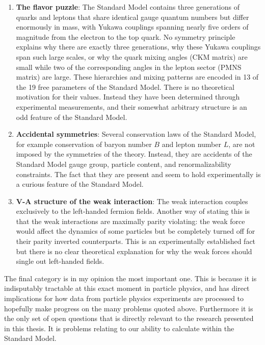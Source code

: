 \begin{enumerate}
    \item{
        \textbf{The flavor puzzle}: The Standard Model contains three generations of quarks and leptons that share identical gauge quantum numbers but differ enormously in mass, with Yukawa couplings spanning nearly five orders of magnitude from the electron to the top quark.
        No symmetry principle explains why there are exactly three generations, why these Yukawa couplings span such large scales, or why the quark mixing angles (CKM matrix) are small while two of the corresponding angles in the lepton sector (PMNS matrix) are large.
        These hierarchies and mixing patterns are encoded in 13 of the 19 free parameters of the Standard Model.
        There is no theoretical motivation for their values.
        Instead they have been determined through experimental measurements, and their somewhat arbitrary structure is an odd feature of the Standard Model.
    }
    \item{
        \textbf{Accidental symmetries}: Several conservation laws of the Standard Model, for example conservation of baryon number $B$ and lepton number $L$, are not imposed by the symmetries of the theory.
        Instead, they are accidents of the Standard Model gauge group, particle content, and renormalizability constraints.
        The fact that they are present and seem to hold experimentally is a curious feature of the Standard Model.
    }
    \item{
        \textbf{V-A structure of the weak interaction}: The weak interaction couples exclusively to the left-handed fermion fields.
        Another way of stating this is that the weak interactions are maximally parity violating: the weak force would affect the dynamics of some particles but be completely turned off for their parity inverted counterparts.
        This is an experimentally established fact but there is no clear theoretical explanation for why the weak forces should single out left-handed fields.
    }
\end{enumerate}

The final category is in my opinion the most important one.
This is because it is indisputably tractable at this exact moment in particle physics, and has direct implications for how data from particle physics experiments are processed to hopefully make progress on the many problems quoted above.
Furthermore it is the only set of open questions that is directly relevant to the research presented in this thesis.
It is problems relating to our ability to calculate within the Standard Model.

